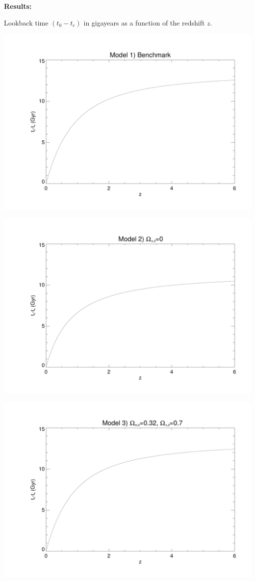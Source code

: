 \documentclass[a4paper,12pt]{article}
\begin{document}
\begin{itemize}
\vspace*{1cm}
\textbf{Results:}

Lookback time $(t_0-t_e)$ in gigayears as a function of the redshift $z$.

\centerline{\includegraphics[scale=0.6]{advanced_part5a.pdf}}

\centerline{\includegraphics[scale=0.6]{advanced_part5b.pdf}}

\centerline{\includegraphics[scale=0.6]{advanced_part5c.pdf}}


\end{itemize}
\end{document}
